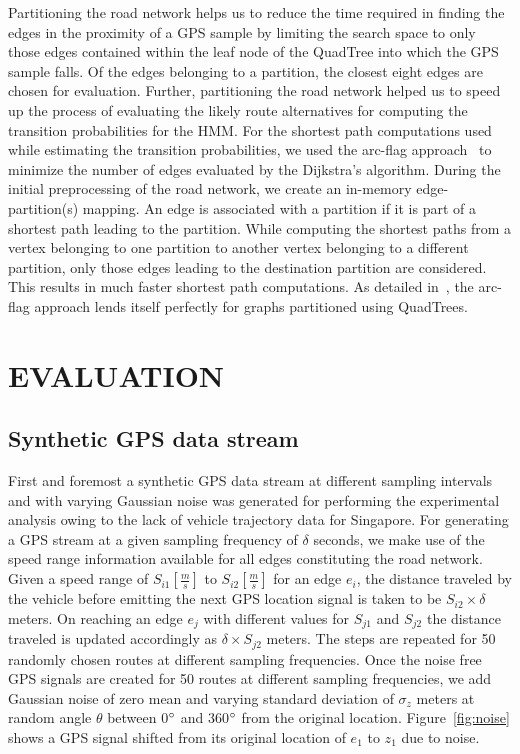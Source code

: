 \documentclass{wscpaperproc}
\theoremstyle{wsc}
\begin{document}
Partitioning  the road network helps us to reduce the time required in finding the edges in the proximity of a GPS sample by limiting the search space to only those edges contained within the leaf node of the QuadTree into which the GPS sample falls. Of the edges belonging to a partition, the closest eight edges are chosen for evaluation. Further, partitioning the road network  helped us to speed up the process of evaluating the likely route alternatives for computing the transition probabilities for the HMM. For the shortest path computations used while estimating the transition probabilities, we used the arc-flag approach~ to minimize the number of edges evaluated by the Dijkstra's algorithm. During the  initial preprocessing of the road network, we create an in-memory edge-partition(s) mapping. An edge is associated with a partition if it is part of  a shortest path leading to the partition. While computing the shortest paths from a vertex belonging to one partition to another vertex belonging to a different partition, only those edges leading to the destination partition are considered. This results in much faster shortest path computations. As detailed in~, the arc-flag approach lends itself perfectly for graphs partitioned using QuadTrees. 







\section{EVALUATION}
\label{sec:evaluation}

\subsection{Synthetic GPS data stream}

First and foremost a synthetic GPS data stream at different sampling intervals and with varying Gaussian noise was generated for performing the experimental analysis owing to the lack of vehicle trajectory data for Singapore. For generating a GPS stream at a given sampling frequency of $\delta$ seconds, we make use of the speed range information available for all edges constituting the road network. Given a speed range of $S_{i1} [\frac{m}{s}]$ to $S_{i2} [\frac{m}{s}]$ for an edge $e_{i}$, the distance traveled by the vehicle before emitting the next GPS location signal is taken to be $S_{i2}\times \delta$ meters. On reaching an edge $e_{j}$ with different values for $S_{j1}$ and $S_{j2}$ the distance traveled is updated accordingly as  $\delta \times S_{j2}$ meters. The steps are repeated for 50 randomly chosen routes at different sampling frequencies. Once the noise free GPS signals are created for 50 routes at different sampling frequencies, we add Gaussian noise of zero mean and varying standard deviation of $\sigma_{z}$ meters at random angle $\theta$ between 0$\degree$ and 360$\degree$ from the original location. Figure~\ref{fig:noise} shows a GPS signal shifted from its original location of $e_{1}$ to $z_{1}$ due to noise. 
\end{document}
